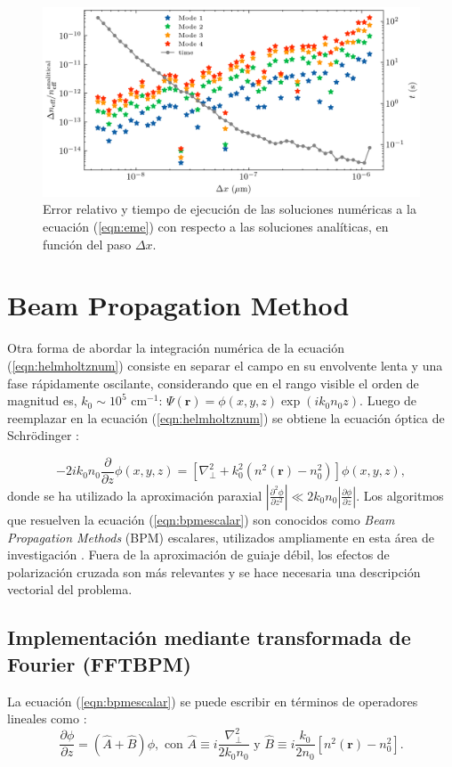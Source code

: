 \begin{figure}[H]
	\centering
	\includegraphics[width=0.8\linewidth]{media/numerical_slab}
	\caption[Error relativo y tiempo de ejecución.]{Error relativo y tiempo de ejecución de las soluciones numéricas a la ecuación (\ref{eqn:eme}) con respecto a las soluciones analíticas, en función del paso $\Delta x$. \label{fig:emenumerror}}
\end{figure}
\section{Beam Propagation Method} 

Otra forma de abordar la integración numérica de la ecuación (\ref{eqn:helmholtznum}) consiste en separar el campo en su envolvente lenta y una fase rápidamente oscilante, considerando que en el rango visible el orden de magnitud es, $k_0 \sim 10 ^{5} \text{ cm}^{-1}$: $\Psi(\textbf{r}) = \phi(x,y,z)\exp(ik_0 n_0 z)$. Luego de reemplazar en la ecuación (\ref{eqn:helmholtznum}) se obtiene la ecuación óptica de Schrödinger \citep{paraxialschrodinger}:

\begin{equation}
	-2ik_0 n_0\frac{\partial }{\partial z}\phi(x,y, z) =  \left[\nabla_\perp^2 + k_0^2 (n^2(\textbf{r})-n_0^2)\right]\phi(x,y, z), \label{eqn:bpmescalar}
\end{equation} 
donde se ha utilizado la aproximación paraxial $\left| \frac{\partial^2 \phi}{\partial z^2} \right| \ll 2 k_0 n_0\left| \frac{\partial \phi}{\partial z} \right|$. Los algoritmos que resuelven la ecuación (\ref{eqn:bpmescalar}) son conocidos como \textit{Beam Propagation Methods} (BPM) escalares, utilizados ampliamente en esta área de investigación \cite{bics, interorbital, OAMCaging, vortex, bpm}. Fuera de la aproximación de guiaje débil, los efectos de polarización cruzada son más relevantes y se hace necesaria una descripción vectorial del problema.
\subsection{Implementación mediante transformada de Fourier (FFTBPM)}
La ecuación (\ref{eqn:bpmescalar}) se puede escribir en términos de operadores lineales como \citep{bpm}: 
\begin{equation}
	\frac{\partial \phi}{\partial z}  = \left(\hat{A} + \hat{B}\right)\phi, \text{ con } \hat{A} \equiv i\frac{\nabla^2_\perp}{2k_0n_0}\text{ y } \hat{B} \equiv i\frac{k_0}{2n_0}\left[n^2(\textbf{r})-n_0^2\right]. \label{eqn:bpmop}
\end{equation}

